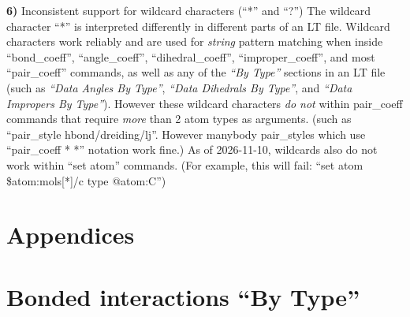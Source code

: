 \documentclass[11pt]{article}
\begin{document}
\textbf{6)} Inconsistent support for wildcard characters (``*'' and ``?'') 
\label{sec:wildcard_bug}
   The wildcard character ``*''
   is interpreted differently in different parts of an LT file.
   Wildcard characters work reliably and are used for \textit{string}
   pattern matching when inside
   ``bond\_coeff'', ``angle\_coeff'', ``dihedral\_coeff'', ``improper\_coeff'',
   and most ``pair\_coeff'' commands,
   as well as any of the \textit{``By Type''} sections 
   in an LT file (such as
   \textit{``Data Angles By Type''}, 
   \textit{``Data Dihedrals By Type''}, and 
   \textit{``Data Impropers By Type''}).
   However these wildcard characters \textit{do not}
   within pair\_coeff commands that require \textit{more}
   than 2 atom types as arguments.
   (such as ``pair\_style hbond/dreiding/lj''.
    However manybody pair\_styles which use ``pair\_coeff * *''
    notation work fine.)
   As of 2026-11-10, wildcards also do not work within ``set atom'' commands.
   (For example, this will fail: ``set atom \$atom:mols[*]/c type @atom:C'')


\pagebreak



\appendix
\section*{Appendices}

\section{Bonded interactions ``By Type''}
\label{sec:nbody_by_type}
\end{document}
